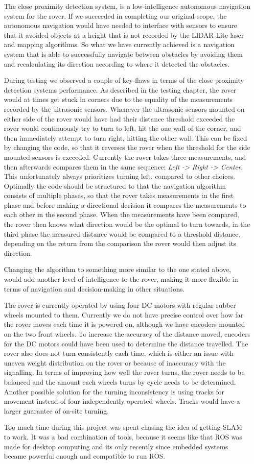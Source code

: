 The close proximity detection system, is a low-intelligence autonomous navigation system for the rover. If we succeeded in completing our original scope, the autonomous navigation would have needed to interface with sensors to ensure that it avoided objects at a height that is not recorded by the LIDAR-Lite laser and mapping algorithms. So what we have currently achieved is a navigation system that is able to successfully navigate between obstacles by avoiding them and recalculating its direction according to where it detected the obstacles.

During testing we observed a couple of key-flaws in terms of the close proximity detection systems performance.
As described in the testing chapter, the rover would at times get stuck in corners due to the equality of the measurements recorded by the ultrasonic sensors. Whenever the ultrasonic sensors mounted on either side of the rover would have had their distance threshold exceeded the rover would continuously try to turn to left, hit the one wall of the corner, and then immediately attempt to turn right, hitting the other wall. This can be fixed by changing the code, so that it reverses the rover when the threshold for the side mounted sensors is exceeded. Currently the rover takes three measurements, and then afterwards compares them in the same sequence: \textit{Left -> Right -> Center}. This unfortunately always prioritizes turning left, compared to other choices. Optimally the code should be structured to that the navigation algorithm consists of multiple phases, so that the rover takes measurements in the first phase and before making a directional decision it compares the measurements to each other in the second phase. When the measurements have been compared, the rover then knows what direction would be the optimal to turn towards, in the third phase the measured distance would be compared to a threshold distance, depending on the return from the comparison the rover would then adjust its direction.

Changing the algorithm to something more similar to the one stated above, would add another level of intelligence to the rover, making it more flexible in terms of navigation and decision-making in other situations.

The rover is currently operated by using four DC motors with regular rubber wheels mounted to them. Currently we do not have precise control over how far the rover moves each time it is powered on, although we have encoders mounted on the two front wheels. To increase the accuracy of the distance moved, encoders for the DC motors could have been used to determine the distance travelled. The rover also does not turn consistently each time, which is either an issue with uneven weight distribution on the rover or because of inaccuracy with the signalling. In terms of improving how well the rover turns, the rover needs to be balanced and the amount each wheels turns by cycle needs to be determined. Another possible solution for the turning inconsistency is using tracks for movement instead of four independently operated wheels. Tracks would have a larger guarantee of on-site turning.

Too much time during this project was spent chasing the idea of getting SLAM to work. It was a bad combination of tools, because it seems like that ROS was made for desktop computing and its only recently since embedded systems became powerful enough and compatible to run ROS.
